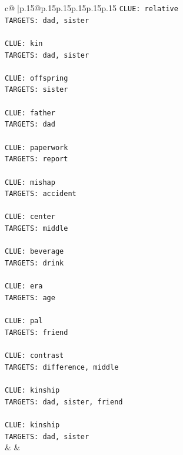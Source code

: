 \documentclass{article}
\begin{document}
{\begin{supertabular}{c@{$\;$}|p{.15\linewidth}@{}p{.15\linewidth}p{.15\linewidth}p{.15\linewidth}p{.15\linewidth}p{.15\linewidth}}
{{{\texttt{CLUE: relative} \\
\texttt{TARGETS: dad, sister} \\
\\ 
\texttt{CLUE: kin} \\
\texttt{TARGETS: dad, sister} \\
\\ 
\texttt{CLUE: offspring} \\
\texttt{TARGETS: sister} \\
\\ 
\texttt{CLUE: father} \\
\texttt{TARGETS: dad} \\
\\ 
\texttt{CLUE: paperwork} \\
\texttt{TARGETS: report} \\
\\ 
\texttt{CLUE: mishap} \\
\texttt{TARGETS: accident} \\
\\ 
\texttt{CLUE: center} \\
\texttt{TARGETS: middle} \\
\\ 
\texttt{CLUE: beverage} \\
\texttt{TARGETS: drink} \\
\\ 
\texttt{CLUE: era} \\
\texttt{TARGETS: age} \\
\\ 
\texttt{CLUE: pal} \\
\texttt{TARGETS: friend} \\
\\ 
\texttt{CLUE: contrast} \\
\texttt{TARGETS: difference, middle} \\
\\ 
\texttt{CLUE: kinship} \\
\texttt{TARGETS: dad, sister, friend} \\
\\ 
\texttt{CLUE: kinship} \\
\texttt{TARGETS: dad, sister} \\
            }
        }
    }
    & & \\ \\


\end{supertabular}}
\end{document}
